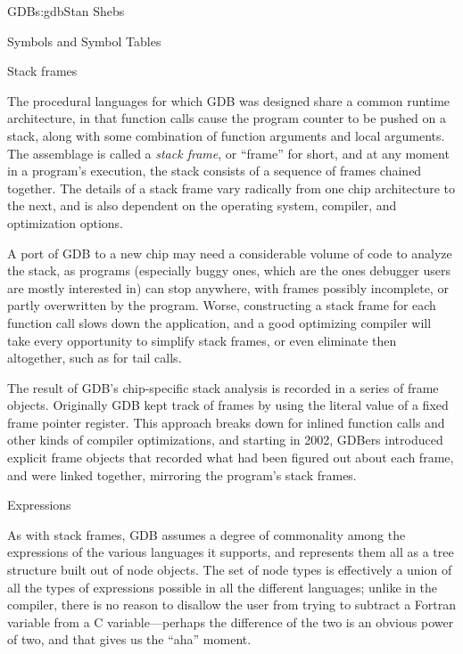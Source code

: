 \begin{aosachapter}{GDB}{s:gdb}{Stan Shebs}
\begin{aosasect2}{Symbols and Symbol Tables}
\end{aosasect2}

\begin{aosasect2}{Stack frames}

The procedural languages for which GDB was designed share a common
runtime architecture, in that function calls cause the program counter
to be pushed on a stack, along with some combination of function
arguments and local arguments.  The assemblage is called a {\em stack
  frame}, or ``frame'' for short, and at any moment in a program's
execution, the stack consists of a sequence of frames chained
together.  The details of a stack frame vary radically from one chip
architecture to the next, and is also dependent on the operating
system, compiler, and optimization options.

A port of GDB to a new chip may need a considerable volume of code to
analyze the stack, as programs (especially buggy ones, which are the
ones debugger users are mostly interested in) can stop anywhere, with
frames possibly incomplete, or partly overwritten by the program.
Worse, constructing a stack frame for each function call slows down the
application, and a good optimizing compiler will take every
opportunity to simplify stack frames, or even eliminate then
altogether, such as for tail calls.

The result of GDB's chip-specific stack analysis is recorded in a
series of frame objects.  Originally GDB kept track of frames by using
the literal value of a fixed frame pointer register.  This approach
breaks down for inlined function calls and other kinds of compiler
optimizations, and starting in 2002, GDBers introduced explicit frame
objects that recorded what had been figured out about each frame, and
were linked together, mirroring the program's stack frames.

\end{aosasect2}

\begin{aosasect2}{Expressions}

As with stack frames, GDB assumes a degree of commonality among the
expressions of the various languages it supports, and represents them
all as a tree structure built out of node objects.  The set of node
types is effectively a union of all the types of expressions possible
in all the different languages; unlike in the compiler, there is no
reason to disallow the user from trying to subtract a Fortran variable
from a C variable---perhaps the difference of the two is an obvious
power of two, and that gives us the ``aha'' moment.


\end{aosasect2}
\end{aosachapter}
